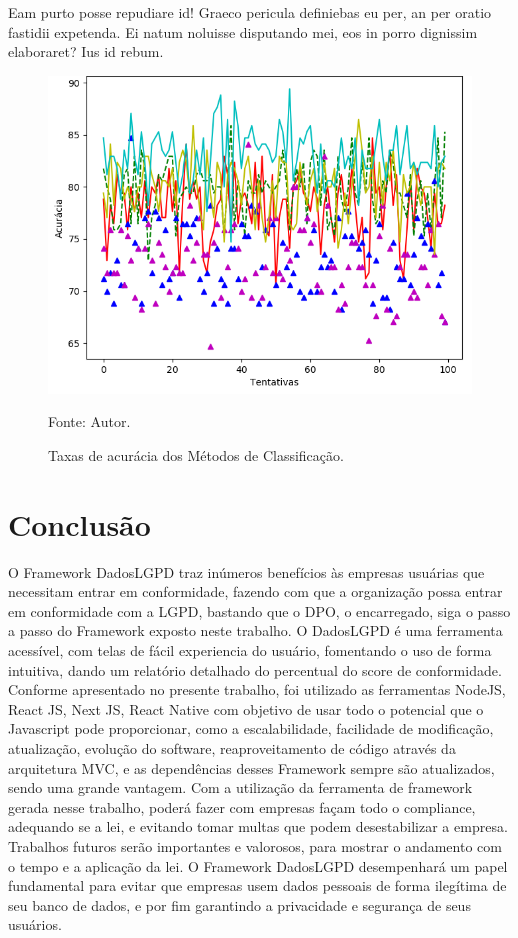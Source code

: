 \documentclass[
	12pt,				%
	openright,			%
	oneside,			%
	a4paper,			%
	english,			%
	french,				%
	spanish,			%
	brazil,				%
	]{abntex2}
\begin{document}
Eam purto posse repudiare id! Graeco pericula definiebas eu per, an per oratio fastidii expetenda. Ei natum noluisse disputando mei, eos in porro dignissim elaboraret? Ius id rebum.
\begin{figure}[ht]
    \centering
    \caption{Taxas de acurácia dos Métodos de Classificação.}
    \includegraphics[width=5.0in]{Images/acc-classification.png}
    \label{fig: grafico-acc}
    
    \centering \small Fonte: Autor.
\end{figure}

 \chapter{Conclusão}
 \label{ch: conclusao}
 
O Framework DadosLGPD traz inúmeros benefícios às empresas usuárias que necessitam entrar em conformidade, fazendo com que a organização possa entrar em conformidade com a LGPD, bastando que o DPO, o encarregado, siga o passo a passo do Framework exposto neste trabalho. O DadosLGPD é uma ferramenta acessível, com telas de fácil experiencia do usuário, fomentando o uso de forma intuitiva, dando um relatório detalhado do percentual do score de conformidade.
Conforme apresentado no presente trabalho, foi utilizado as ferramentas NodeJS, React JS, Next JS, React Native com objetivo de usar todo o potencial que o Javascript pode proporcionar, como a escalabilidade, facilidade de modificação, atualização, evolução do software, reaproveitamento de código através da arquitetura MVC, e  as dependências desses Framework sempre são atualizados, sendo uma grande vantagem. 
Com a utilização da ferramenta de framework gerada nesse trabalho, poderá fazer com empresas façam todo o compliance, adequando se a lei, e evitando tomar multas que podem desestabilizar a empresa. 
Trabalhos futuros serão importantes e valorosos, para mostrar o andamento com o tempo e a aplicação da lei. O Framework DadosLGPD desempenhará um papel fundamental para evitar que empresas usem dados pessoais de forma ilegítima de seu banco de dados, e por fim garantindo a privacidade e segurança de seus usuários. 
\end{document}
